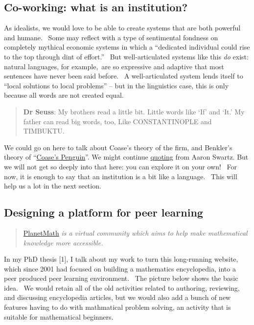 \subsection{Co-working: what is an institution?}

As idealists, we would love to be able to create systems that are both
powerful and humane.~ Some may reflect with a type of sentimental
fondness on completely mythical economic systems in which a ``dedicated
individual could rise to the top through dint of effort.''~
But well-articulated systems like this \emph{do} exist: natural
languages, for example,~are so expressive and adaptive that most
sentences have never been said before.~ A well-articulated system lends
itself to ``local solutions to local problems'' -- but in the
linguistics case, this is only because all words are not created equal.

\begin{quote}
\textbf{Dr Seuss}: My brothers read a little bit. Little words like `If'
and `It.' My father can read big words, too, Like CONSTANTINOPLE and
TIMBUKTU.
\end{quote}

We could go on here to talk about Coase's theory of the firm, and
Benkler's theory of
``\href{http://www.yale.edu/yalelj/112/BenklerWEB.pdf}{Coase's
Penguin}''. We might continue
\href{http://www.aaronsw.com/weblog/perfectinstitutions}{quoting} from
Aaron Swartz. But we will not get so deeply into that here: you can
explore it on your own!~ For now, it is enough to say that an
institution is a bit like a language.~ This will help us a lot in the
next section.

\subsection{Designing a platform for peer learning\emph{}}

\begin{quote}
\href{planetmath.org}{PlanetMath} \emph{is a virtual community which
aims to help make mathematical knowledge more accessible.}
\end{quote}

In my PhD thesis {[}1{]}, I talk about my work to turn this
long-running website, which since 2001 had focused on building a
mathematics encyclopedia, into a peer produced peer learning
environment.~ The picture below shows the basic idea.~ We would retain
all of the old activities related to authoring, reviewing, and
discussing encyclopedia articles, but we would also add a bunch of new
features having to do with mathmatical problem solving, an activity
that is suitable for mathematical beginners.

